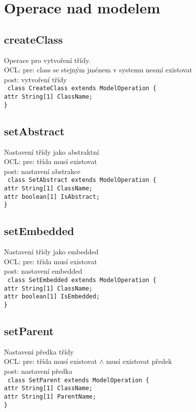 \documentclass[11pt,a4paper]{article}
\begin{document}
\section{Operace nad modelem}
	\subsection{createClass}
	Operace pro vytvoření třídy. \\
	OCL: pre: class se stejným jménem v systemu nesmí existovat \\
	post: vytvoření třídy\\
	\texttt{
			    class CreateClass extends ModelOperation \{ \\
      				attr String[1] ClassName; \\
   				\}	
	}
	\subsection{setAbstract}
	Nastavení třídy jako abstraktní \\
	OCL: pre: třída musí existovat\\
	post: nastavení abstrakce \\
	\texttt{
			    class SetAbstract extends ModelOperation \{\\
      				attr String[1] ClassName;\\
      				attr boolean[1] IsAbstract;\\
    		\}
	}
	\subsection{setEmbedded}
	Nastavení třídy jako embedded \\
	OCL: pre: třída musí existovat\\ 
	post: nastavení embedded \\
	\texttt{
    class SetEmbedded extends ModelOperation \{\\
      attr String[1] ClassName;\\
      attr boolean[1] IsEmbedded;\\
    \}
	}
	\subsection{setParent}
	Nastavení předka třídy \\
	OCL: pre: třída musí existovat $\wedge$ musí existovat předek\\
	post: nastavení předka \\
	\texttt{
    class SetParent extends ModelOperation \{\\
      attr String[1] ClassName;\\
      attr String[1] ParentName;\\
    \}
	}
\end{document}
